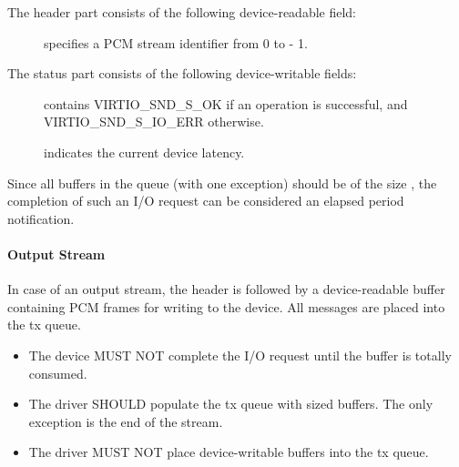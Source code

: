 The header part consists of the following device-readable field:

\begin{description}
\item[] specifies a PCM stream identifier from 0 to  - 1.
\end{description}

The status part consists of the following device-writable fields:

\begin{description}
\item[] contains VIRTIO_SND_S_OK if an operation is successful,
and VIRTIO_SND_S_IO_ERR otherwise.
\item[] indicates the current device latency.
\end{description}

Since all buffers in the queue (with one exception) should be of the size
, the completion of such an I/O request can be considered an
elapsed period notification.

\paragraph{Output Stream}

In case of an output stream, the header is followed by a device-readable buffer
containing PCM frames for writing to the device. All messages are placed into
the tx queue.


\begin{itemize}
\item The device MUST NOT complete the I/O request until the buffer is totally
consumed.
\end{itemize}


\begin{itemize}
\item The driver SHOULD populate the tx queue with  sized
buffers. The only exception is the end of the stream.
\item The driver MUST NOT place device-writable buffers into the tx queue.
\end{itemize}

